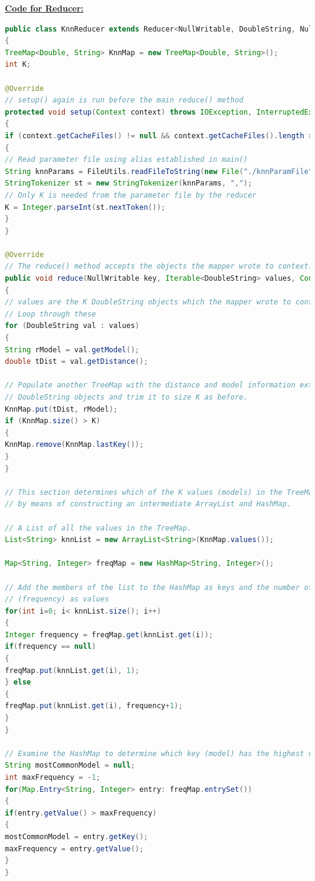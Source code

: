 \documentclass[11pt,article]{memoir}
\begin{document}
\begin{flushleft}
\begin{lstlisting}[language=java]
\end{lstlisting}

\textbf{\underline{Code for Reducer:}}
\begin{lstlisting}[language=java]
public class KnnReducer extends Reducer<NullWritable, DoubleString, NullWritable, Text>
{
TreeMap<Double, String> KnnMap = new TreeMap<Double, String>();
int K;

@Override
// setup() again is run before the main reduce() method
protected void setup(Context context) throws IOException, InterruptedException
{
if (context.getCacheFiles() != null && context.getCacheFiles().length > 0)
{
// Read parameter file using alias established in main()
String knnParams = FileUtils.readFileToString(new File("./knnParamFile"));
StringTokenizer st = new StringTokenizer(knnParams, ",");
// Only K is needed from the parameter file by the reducer
K = Integer.parseInt(st.nextToken());
}
}

@Override
// The reduce() method accepts the objects the mapper wrote to context: a NullWritable and a DoubleString
public void reduce(NullWritable key, Iterable<DoubleString> values, Context context) throws IOException, InterruptedException
{
// values are the K DoubleString objects which the mapper wrote to context
// Loop through these
for (DoubleString val : values)
{
String rModel = val.getModel();
double tDist = val.getDistance();

// Populate another TreeMap with the distance and model information extracted from the
// DoubleString objects and trim it to size K as before.
KnnMap.put(tDist, rModel);
if (KnnMap.size() > K)
{
KnnMap.remove(KnnMap.lastKey());
}
}	

// This section determines which of the K values (models) in the TreeMap occurs most frequently
// by means of constructing an intermediate ArrayList and HashMap.

// A List of all the values in the TreeMap.
List<String> knnList = new ArrayList<String>(KnnMap.values());

Map<String, Integer> freqMap = new HashMap<String, Integer>();

// Add the members of the list to the HashMap as keys and the number of times each occurs
// (frequency) as values
for(int i=0; i< knnList.size(); i++)
{  
Integer frequency = freqMap.get(knnList.get(i));
if(frequency == null)
{
freqMap.put(knnList.get(i), 1);
} else
{
freqMap.put(knnList.get(i), frequency+1);
}
}

// Examine the HashMap to determine which key (model) has the highest value (frequency)
String mostCommonModel = null;
int maxFrequency = -1;
for(Map.Entry<String, Integer> entry: freqMap.entrySet())
{
if(entry.getValue() > maxFrequency)
{
mostCommonModel = entry.getKey();
maxFrequency = entry.getValue();
}
}


\end{lstlisting}
\end{flushleft}
\end{document}
